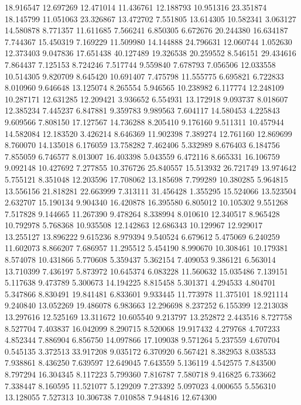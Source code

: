 18.916547
12.697269
12.471014
11.436761
12.188793
10.951316
23.351874
18.145799
11.051063
23.326867
13.472702
7.551805
13.614305
10.582341
3.063127
14.580878
8.771357
11.611685
7.566241
6.850305
6.672676
20.244380
16.634187
7.744367
15.450319
7.169229
11.509980
14.144888
24.796631
12.060744
1.052630
12.373403
9.047836
17.651438
40.127489
19.326538
20.259552
8.546151
29.434616
7.864437
7.125153
8.724246
7.517744
9.559840
7.678793
7.056506
12.033558
10.514305
9.820709
8.645420
10.691407
7.475798
11.555775
6.695821
6.722833
8.010960
9.646648
13.125074
8.265554
5.946565
10.238982
6.117774
12.248109
10.287171
12.631285
12.209421
3.936652
6.554931
13.172918
9.093737
8.018607
12.385234
7.445237
6.847881
9.359783
9.989563
7.604117
14.580453
4.225843
9.609566
7.808150
17.127567
14.736288
8.205410
9.176160
9.511311
10.457944
14.582084
12.183520
3.426214
8.646369
11.902398
7.389274
12.761160
12.869699
8.760070
14.135018
6.176059
13.758282
7.462406
5.332989
8.676403
6.184756
7.855059
6.746577
8.013007
16.403398
5.043559
6.472116
8.665331
16.106759
9.092148
10.427692
7.277855
10.376726
25.840557
15.513932
26.721749
13.974642
5.755121
8.351048
12.203596
17.708062
13.185698
7.799289
10.380285
5.964815
13.556156
21.818281
22.663999
7.313111
31.456428
1.355295
15.524066
13.523504
2.632707
15.190134
9.904340
16.420878
16.395580
6.805012
10.105302
9.551268
7.517828
9.144665
11.267390
9.478264
8.338994
8.010610
12.340517
8.965428
10.792978
5.768368
10.935508
12.142863
12.686343
10.129967
12.929017
13.255127
13.896222
9.615236
8.979394
9.540524
6.679612
5.475069
6.240259
11.602073
8.866207
7.686957
11.295512
5.454190
8.990670
10.308461
10.179381
8.574078
10.431866
5.770608
5.359437
5.362154
7.409053
9.386121
6.563014
13.710399
7.436197
5.873972
10.645374
6.083228
11.560632
15.035486
7.139151
5.117638
9.473789
5.300673
14.194225
8.815458
5.301371
4.294533
4.804701
5.347866
8.830491
19.841481
6.833601
9.933445
11.773978
11.375101
18.921114
9.240840
13.052269
19.486078
6.983663
12.296698
8.237252
6.155399
12.213038
13.297616
12.525169
13.311672
10.605540
9.213797
13.252872
2.443516
8.727758
8.527704
7.403837
16.042099
8.290715
8.520068
19.917432
4.279768
4.707233
4.852344
7.886904
6.856750
14.097866
17.109038
9.571264
5.237559
4.670704
0.545135
3.372513
33.917208
9.035172
6.370920
6.567421
8.382953
8.038533
7.938861
8.436250
7.639597
12.649045
7.643559
5.136119
4.542575
7.843500
8.797294
16.304345
8.117223
5.799360
7.816787
7.580718
9.416825
6.733662
7.338447
8.160595
11.521077
5.129209
7.273392
5.097023
4.000655
5.556310
13.128055
7.527313
10.306738
7.010858
7.944816
12.674300
